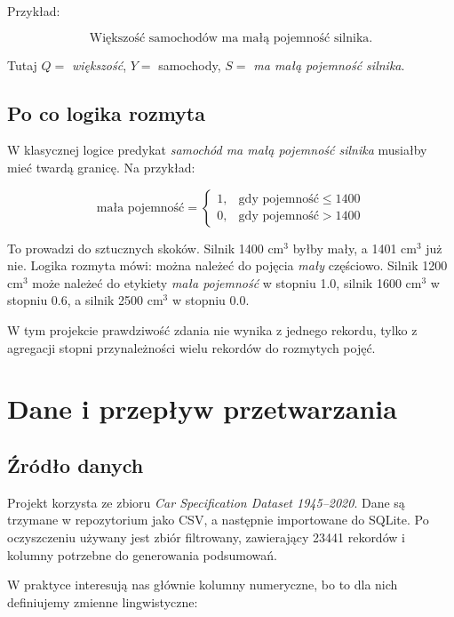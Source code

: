 \documentclass[11pt,a4paper]{article}
\newcommand{\important}[1]{\colorbox{softaccent}{\parbox{0.96\linewidth}{#1}}}
\begin{document}
Przykład:

\[
\text{Większość samochodów ma małą pojemność silnika.}
\]

Tutaj \(Q=\) \emph{większość}, \(Y=\) samochody, \(S=\) \emph{ma małą pojemność silnika}.

\subsection{Po co logika rozmyta}

W klasycznej logice predykat \emph{samochód ma małą pojemność silnika} musiałby mieć twardą granicę. Na przykład:

\[
\text{mała pojemność} =
\begin{cases}
1, & \text{gdy pojemność} \le 1400\\
0, & \text{gdy pojemność} > 1400
\end{cases}
\]

To prowadzi do sztucznych skoków. Silnik 1400 cm\(^3\) byłby mały, a 1401 cm\(^3\) już nie. Logika rozmyta mówi: można należeć do pojęcia \emph{mały} częściowo. Silnik 1200 cm\(^3\) może należeć do etykiety \emph{mała pojemność} w stopniu 1.0, silnik 1600 cm\(^3\) w stopniu 0.6, a silnik 2500 cm\(^3\) w stopniu 0.0.

\important{W tym projekcie prawdziwość zdania nie wynika z jednego rekordu, tylko z agregacji stopni przynależności wielu rekordów do rozmytych pojęć.}

\section{Dane i przepływ przetwarzania}

\subsection{Źródło danych}

Projekt korzysta ze zbioru \emph{Car Specification Dataset 1945--2020}. Dane są trzymane w repozytorium jako CSV, a następnie importowane do SQLite. Po oczyszczeniu używany jest zbiór filtrowany, zawierający 23441 rekordów i kolumny potrzebne do generowania podsumowań.

W praktyce interesują nas głównie kolumny numeryczne, bo to dla nich definiujemy zmienne lingwistyczne:
\end{document}
